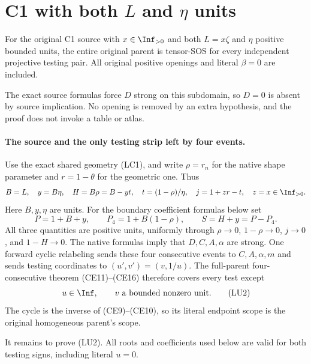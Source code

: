 \section[C1 with both L and eta units]{C1 with both $L$ and $\eta$ units}
\label{sec:r7-c1-L-eta-unit}

\begin{theorem}
For the original C1 source with $x\in\Inf_{>0}$ and both
$L=x\zeta$ and $\eta$ positive bounded units, the entire original
parent is tensor-SOS for every independent projective testing pair.
All original positive openings and literal $\beta=0$ are included.
\end{theorem}

The exact source formulas force $D$ strong on this subdomain, so
$D=0$ is absent by source implication.  No opening is removed by
an extra hypothesis, and the proof does not invoke a table or atlas.

\paragraph{The source and the only testing strip left by four events.}
Use the exact shared geometry (LC1), and write $\rho=r_n$ for the
native shape parameter and $r=1-\theta$ for the geometric one.
Thus
\[
 B=L,\quad y=B\eta,\quad H=B\rho=B-yt,\quad
 t=(1-\rho)/\eta,\quad j=1+zr-t,
 \quad z=x\in\Inf_{>0}.
\]
Here $B,y,\eta$ are units.  For the boundary coefficient formulas
below set
\[
 P=1+B+y,\qquad P_4=1+B(1-\rho),\qquad S=H+y=P-P_4.
                                                               \tag{LU1}
\]
All three quantities are positive units, uniformly through
$\rho\to0$, $1-\rho\to0$, $j\to0$, and $1-H\to0$.
The native formulas imply that $D,C,A,\alpha$ are strong.
One forward cyclic relabeling sends these four consecutive events
to $C,A,\alpha,m$ and sends testing coordinates to
$(u',v')=(v,1/u)$.  The full-parent four-consecutive theorem
(CE11)--(CE16) therefore covers every test except
\[
                    u\in\Inf,\qquad v\text{ a bounded nonzero unit}.
                                                               \tag{LU2}
\]
The cycle is the inverse of (CE9)--(CE10), so its literal endpoint
scope is the original homogeneous parent's scope.

It remains to prove (LU2).  All roots and coefficients used below
are valid for both testing signs, including literal $u=0$.

